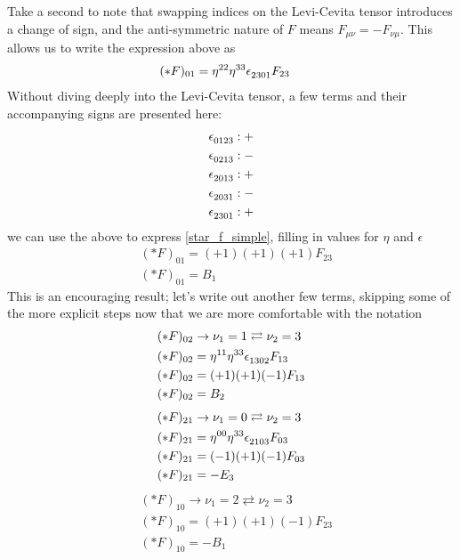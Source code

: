 %
Take a second to note that swapping indices on the Levi-Cevita tensor introduces a change of sign, and the anti-symmetric nature of $F$ means $F_{\mu\nu} = - F_{\nu\mu}$. This allows us to write the expression above as
%
\begin{align} \label{star_f_simple}
	&(\ast F)_{0 1} = \eta\indices{^{22}}  \eta\indices{^{33}} \epsilon\indices{_{2301}} F_{23}
\end{align}
%
Without diving deeply into the Levi-Cevita tensor, a few terms and their accompanying signs are presented here: 
%
\begin{align}
\epsilon\indices{_{0123}}: +\\
\epsilon\indices{_{0213}}: -\\
\epsilon\indices{_{2013}}: +\\
\epsilon\indices{_{2031}}: -\\
\epsilon\indices{_{2301}}: +
\end{align}
%
we can use the above to express \ref{star_f_simple}, filling in values for $\eta$ and $\epsilon$
%
\begin{align}
	&(\ast F)_{0 1} = (+1) (+1) (+1) F_{23}\\
	&(\ast F)_{0 1} = B_1
\end{align}
%
This is an encouraging result; let's write out another few terms, skipping some of the more explicit steps now that we are more comfortable with the notation
%
\begin{align}
	&(\ast F)_{0 2} \rightarrow \nu_1 = 1 \rightleftarrows \nu_2 = 3 \\
	&(\ast F)_{0 2} = \eta\indices{^{11}}  \eta\indices{^{33}} \epsilon\indices{_{1302}} F_{13} \\
	&(\ast F)_{0 2} = (+1) (+1) (-1) F_{13} \\
	&(\ast F)_{0 2} = B_2
\end{align}
%
\begin{align}
	&(\ast F)_{2 1} \rightarrow \nu_1 = 0 \rightleftarrows \nu_2 = 3 \\
	&(\ast F)_{2 1} = \eta\indices{^{00}}  \eta\indices{^{33}} \epsilon\indices{_{2103}} F_{03} \\
	&(\ast F)_{2 1} = (-1) (+1) (-1) F_{03} \\
	&(\ast F)_{2 1} = -E_3
\end{align}
%
\begin{align}
	&(\ast F)_{1 0} \rightarrow \nu_1 = 2 \rightleftarrows \nu_2 = 3 \\
	&(\ast F)_{1 0} = (+1) (+1) (-1) F_{23} \\
	&(\ast F)_{1 0} = -B_1
\end{align}
